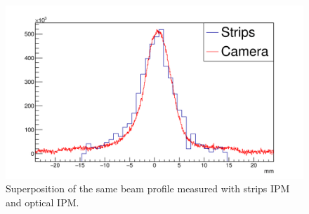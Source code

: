 \begin{figure}[!ht]
	\begin{center}
		\includegraphics[width=\textwidth]{04_IPHI_Test/figures/fig000_MCP_strips}
	\end{center}
	\caption[Superposition of the same beam profile measured with strips IPM and optical IPM]{Superposition of the same beam profile measured with strips IPM and optical IPM.}
	\label{chap4:MCP_strip}
\end{figure}

